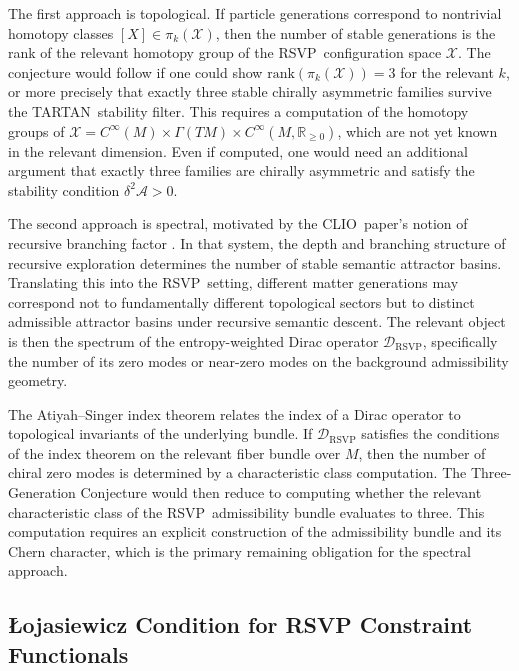 \documentclass[12pt,a4paper]{article}
\newcommand{\RSVP}{\textrm{RSVP}}
\newcommand{\CLIO}{\textrm{CLIO}}
\newcommand{\TARTAN}{\textrm{TARTAN}}
\newcommand{\Field}{\mathcal{X}}
\begin{document}
The first approach is topological. If particle generations correspond to
nontrivial homotopy classes $[X]\in\pi_k(\Field)$, then the number of stable
generations is the rank of the relevant homotopy group of the \RSVP\
configuration space $\Field$. The conjecture would follow if one could show
$\mathrm{rank}(\pi_k(\Field))=3$ for the relevant $k$, or more precisely that
exactly three stable chirally asymmetric families survive the \TARTAN\ stability
filter. This requires a computation of the homotopy groups of $\Field=C^\infty(M)
\times\Gamma(TM)\times C^\infty(M,\mathbb{R}_{\geq 0})$, which are not yet known
in the relevant dimension. Even if computed, one would need an additional
argument that exactly three families are chirally asymmetric and satisfy the
stability condition $\delta^2\mathcal{A}>0$.

The second approach is spectral, motivated by the \CLIO\ paper's notion of
recursive branching factor \cite{Cheng2025}. In that system, the depth and
branching structure of recursive exploration determines the number of stable
semantic attractor basins. Translating this into the \RSVP\ setting, different
matter generations may correspond not to fundamentally different topological
sectors but to distinct admissible attractor basins under recursive semantic
descent. The relevant object is then the spectrum of the entropy-weighted
Dirac operator $\mathcal{D}_\RSVP$, specifically the number of its zero modes
or near-zero modes on the background admissibility geometry.

The Atiyah--Singer index theorem \cite{AtiyahSinger1963} relates the index of
a Dirac operator to topological invariants of the underlying bundle. If
$\mathcal{D}_\RSVP$ satisfies the conditions of the index theorem on the
relevant fiber bundle over $M$, then the number of chiral zero modes is
determined by a characteristic class computation. The Three-Generation
Conjecture would then reduce to computing whether the relevant characteristic
class of the \RSVP\ admissibility bundle evaluates to three. This computation
requires an explicit construction of the admissibility bundle and its Chern
character, which is the primary remaining obligation for the spectral approach.

\subsection{Łojasiewicz Condition for RSVP Constraint Functionals}
\end{document}
